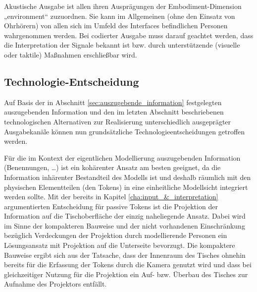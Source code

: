 Akustische Ausgabe ist allen ihren Ausprägungen der Embodiment-Dimension „environment“ zuzuordnen. Sie kann im Allgemeinen (ohne den Einsatz von Ohrhörern) von allen sich im Umfeld des Interfaces befindlichen Personen wahrgenommen werden. Bei codierter Ausgabe muss darauf geachtet werden, dass die Interpretation der Signale bekannt ist bzw. durch unterstützende (visuelle oder taktile) Maßnahmen erschließbar wird.



\subsection{Technologie-Entscheidung} %
\label{sub:output_ansatz_entscheidung}

Auf Basis der in Abschnitt \ref{sec:auszugebende_information} festgelegten auszugebenden Information und den im letzten Abschnitt beschriebenen technologischen Alternativen zur Realisierung unterschiedlich ausgeprägter Ausgabekanäle können nun grundsätzliche Technologieentscheidungen getroffen werden.

Für die im Kontext der eigentlichen Modellierung auszugebenden Information (Benennungen, \ldots) ist ein kohärenter Ansatz am besten geeignet, da die Information inhärenter Bestandteil des Modells ist und deshalb räumlich mit den physischen Elementteilen (den Tokens) in eine einheitliche Modellsicht integriert werden sollte. Mit der bereits in Kapitel \ref{cha:input_&_interpretation} argumentierten Entscheidung für passive Tokens ist die Projektion der Information auf die Tischoberfläche der einzig naheliegende Ansatz. Dabei wird im Sinne der kompakteren Bauweise und der nicht vorhandenen Einschränkung bezüglich Verdeckungen der Projektion durch modellierende Personen ein Lösungsansatz mit Projektion auf die Unterseite bevorzugt. Die kompaktere Bauweise ergibt sich aus der Tatsache, dass der Innenraum des Tisches ohnehin bereits für die Erfassung der Tokens durch die Kamera genutzt wird und dass bei gleichzeitiger Nutzung für die Projektion ein Auf- bzw. Überbau des Tisches zur Aufnahme des Projektors entfällt.

